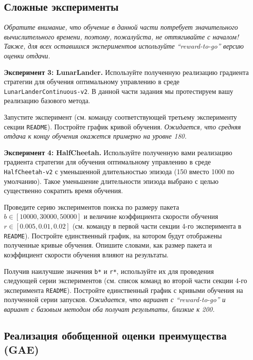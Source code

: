 \documentclass[12pt, oneside]{article}
\begin{document}
\subsection{Сложные эксперименты}

\textit{Обратите внимание, что обучение в данной части потребует значительного вычислительного времени, поэтому, пожалуйста, не оттягивайте с началом! Также, для всех оставшихся экспериментов используйте ``reward-to-go'' версию оценки отдачи.}

\textbf{Эксперимент 3: LunarLander.} Используйте полученную реализацию градиента стратегии для обучения оптимальному управлению в среде \verb|LunarLanderContinuous-v2|. В данной части задания мы протестируем вашу реализацию базового метода.

Запустите эксперимент (см. команду соответствующей  третьему эксперименту секции \verb|README|). Постройте график кривой обучения. \textit{Ожидается, что средняя отдача к концу обучения окажется примерно на уровне 180.}

\textbf{Эксперимент 4: HalfCheetah.} Используйте полученную вами реализацию градиента стратегии для обучения оптимальному управлению в среде \verb|HalfCheetah-v2| с уменьшенной длительностью эпизода (150 вместо 1000 по умолчанию). Такое уменьшение длительности эпизода выбрано с целью существенно сократить время обучения.

Проведите серию экспериментов поиска по размеру пакета $b \in [10000, 30000, 50000]$ и величине коэффициента скорости обучения $r \in [0.005, 0.01, 0.02]$ (см. команду в первой части секции 4-го эксперимента в \verb|README|). Постройте единственный график, на котором будут отображены полученные кривые обучения. Опишите словами, как размер пакета и коэффициент скорости обучения влияют на результаты.

Получив наилучшие значения \verb|b*| и \verb|r*|, используйте их для проведения следующей серии экспериментов (см. список команд во второй части секции 4-го эксперимента \verb|README|). Постройте единственный график с кривыми обучения на полученной серии запусков. \textit{Ожидается, что вариант с ``reward-to-go'' и вариант с базовым методом оба получат результаты, близкие к 200.}

\subsection{Реализация обобщенной оценки преимущества (GAE)}
\end{document}
